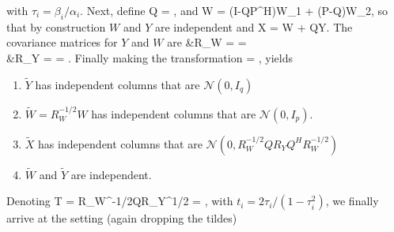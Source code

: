 \ee
with $\tau_i=\beta_i/\alpha_i$. Next, define
\be
Q = ,
\ee
and
\be
W = \left(I-QP^H\right)W_1 + (P-Q)W_2,
\ee
so that by construction $W$ and $Y$ are independent and
\be
X = W + QY.
\ee
The covariance matrices for $Y$ and $W$ are
\be\ba
&R_W =  = \\
&R_Y =  = .
\ea\ee
Finally making the transformation
\be
{} =
\left[\begin{array}{cc}R_W^{-1/2} & 0 \\ 0 &
    R_Y^{-1/2}\end{array}\right]\left[\begin{array}{c}X \\ Y\end{array}\right], 
\ee
yields
\begin{enumerate}
\item $\widetilde{Y}$ has independent columns that are $\mathcal{N}(0,I_q)$
\item $\widetilde{W}=R_W^{-1/2}W$ has independent columns that are $\mathcal{N}(0,I_p)$.
\item $\widetilde{X}$ has independent columns that are
  $\mathcal{N}(0,R_W^{-1/2}QR_YQ^HR_W^{-1/2})$
\item $\widetilde{W}$ and $\widetilde{Y}$ are independent.
\end{enumerate}
Denoting
\be
T = R_W^{-1/2}QR_Y^{1/2} = ,
\ee
with $t_i = 2\tau_i/(1-\tau_i^2)$, we finally arrive at the setting (again dropping the tildes)
